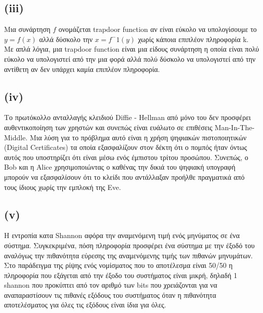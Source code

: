 \documentclass[a4paper, 11pt]{article}
\newcommand{\lt}{\latintext}
\begin{document}
\subsection*{({\lt iii})} Μια συνάρτηση $ f $ ονομάζεται {\lt trapdoor function} αν είναι εύκολο να υπολογίσουμε το $ y = f(x) $ αλλά δύσκολο την $ x = f^-1(y) $ χωρίς κάποια επιπλέον πληροφορία {\lt k}. Με απλά λόγια, μια {\lt trapdoor function} είναι μια είδους συνάρτηση η οποία είναι πολύ εύκολο να υπολογιστεί από την μια φορά αλλά πολύ δύσκολο να υπολογιστεί από την αντίθετη αν δεν υπάρχει καμία επιπλέον πληροφορία.


\subsection*{({\lt iv})} Το πρωτόκολλο ανταλλαγής κλειδιού {\lt Diffie - Hellman} από μόνο του δεν προσφέρει αυθεντικοποίηση των χρηστών και συνεπώς είναι ευάλωτο σε επιθέσεις {\lt Man-In-The-Middle}. Μια λύση για το πρόβλημα αυτό είναι η χρήση ψηφιακών πιστοποιητικών ({\lt Digital Certificates}) τα οποία εξασφαλίζουν στον δέκτη ότι ο πομπός ήταν όντως αυτός που υποστηρίζει ότι είναι μέσω ενός έμπιστου τρίτου προσώπου. Συνεπώς, ο {\lt Bob} και η {\lt Alice} χρησιμοποιώντας ο καθένας την δικιά του ψηφιακή υπογραφή μπορούν να εξασφαλίσουν ότι το κλείδι που αντάλλαξαν προήλθε πραγματικά από τους ίδιους χωρίς την εμπλοκή της {\lt Eve}.


\subsection*{({\lt v})} Η εντροπία κατα {\lt Shannon} αφόρα την αναμενόμενη τιμή ενός μηνύματος σε ένα σύστημα. Συγκεκριμένα, πόση πληροφορία προσφέρει ένα σύστημα με την έξοδό του αναλόγως την πιθανότητα εύρεσης της αναμενόμενης τιμής των πιθανών μηνυμάτων. Στο παράδειγμα της ρίψης ενός νομίσματος που το αποτέλεσμα είναι 50/50 η πληροφορία που εξάγεται από την έξοδο του συστήματος είναι μικρή, δηλαδή 1 {\lt shannon} που προκύπτει από τον αριθμό των {\lt bits} που χρειάζονται για να αναπαραστίσουν τις πιθανές εξόδους του συστήματος όταν η πιθανότητα αποτελέσματος για όλες τις εξόδους είναι ίδια για όλες.
\end{document}
